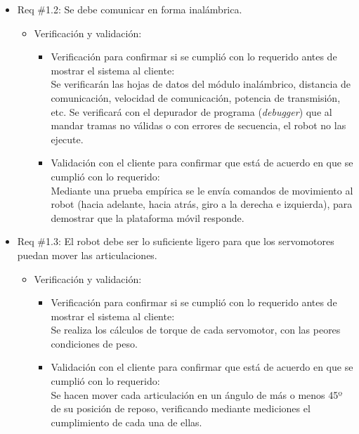 \documentclass[
11pt, %
codirector, %
]{charter}
\begin{document}
\begin{itemize} 
\item Req \#1.2: Se debe comunicar en forma inalámbrica.
\begin{itemize} 
\item Verificación y validación:
	\begin{itemize}
	\item Verificación para confirmar si se cumplió con lo requerido 	antes de mostrar el sistema al cliente:\\
	Se verificarán las hojas de datos del módulo inalámbrico, 
	distancia de comunicación, velocidad de comunicación, potencia
	de transmisión, etc. Se verificará con el depurador de programa
	(\textit{debugger}) que al mandar tramas no válidas o con errores 
	de secuencia, el robot no las ejecute.
	\item Validación con el cliente para confirmar que está de 				acuerdo en que se cumplió con lo requerido:\\
	Mediante una prueba empírica se le envía comandos de movimiento
	al robot (hacia adelante, hacia atrás, giro a la derecha e
	izquierda), para demostrar que la plataforma móvil responde.
\end{itemize}
	
	\end{itemize}
\end{itemize}

\vspace{1cm}

\begin{itemize} 
\item Req \#1.3: El robot debe ser lo suficiente ligero para que los servomotores puedan mover las articulaciones.
\begin{itemize} 
\item Verificación y validación:
	\begin{itemize}
	\item Verificación para confirmar si se cumplió con lo requerido 	antes de mostrar el sistema al cliente:\\
	Se realiza los cálculos de torque de cada servomotor, con las peores condiciones de peso.  
	\item Validación con el cliente para confirmar que está de 				acuerdo en que se cumplió con lo requerido:\\
	Se hacen mover cada articulación en un ángulo de más o menos 45º de su posición de reposo, verificando mediante mediciones el cumplimiento de cada una de ellas.  
	\end{itemize}
\end{itemize}
\end{itemize}
\end{document}

